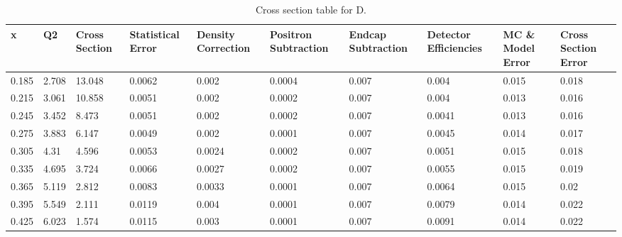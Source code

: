 \begin{sidewaystable}[]
	\caption{Cross section table for D.}\label{CST_D2}
	\begin{tabular}{|p{1cm}|p{1cm}|p{1.5cm}|p{1.5cm}|p{2cm}|p{2cm}|p{1.5cm}|p{1.5cm}|p{2.5cm}|p{2.5cm}|}
		\hline
		x     & Q2     & Cross Section & Statistical Error & Density Correction & Positron Subtraction & Endcap Subtraction & Detector Efficiencies & MC \& Model Error & Cross Section Error \\ \hline
		0.185 & 2.708  & 13.048        & 0.0062            & 0.002              & 0.0004               & 0.007              & 0.004                 & 0.015             & 0.018               \\ \hline
		0.215 & 3.061  & 10.858        & 0.0051            & 0.002              & 0.0002               & 0.007              & 0.004                 & 0.013             & 0.016               \\ \hline
		0.245 & 3.452  & 8.473         & 0.0051            & 0.002              & 0.0002               & 0.007              & 0.0041                & 0.013             & 0.016               \\ \hline
		0.275 & 3.883  & 6.147         & 0.0049            & 0.002              & 0.0001               & 0.007              & 0.0045                & 0.014             & 0.017               \\ \hline
		0.305 & 4.31   & 4.596         & 0.0053            & 0.0024             & 0.0002               & 0.007              & 0.0051                & 0.015             & 0.018               \\ \hline
		0.335 & 4.695  & 3.724         & 0.0066            & 0.0027             & 0.0002               & 0.007              & 0.0055                & 0.015             & 0.019               \\ \hline
		0.365 & 5.119  & 2.812         & 0.0083            & 0.0033             & 0.0001               & 0.007              & 0.0064                & 0.015             & 0.02                \\ \hline
		0.395 & 5.549  & 2.111         & 0.0119            & 0.004              & 0.0001               & 0.007              & 0.0079                & 0.014             & 0.022               \\ \hline
		0.425 & 6.023  & 1.574         & 0.0115            & 0.003              & 0.0001               & 0.007              & 0.0091                & 0.014             & 0.022               \\ \hline

\end{tabular}
\end{sidewaystable}
